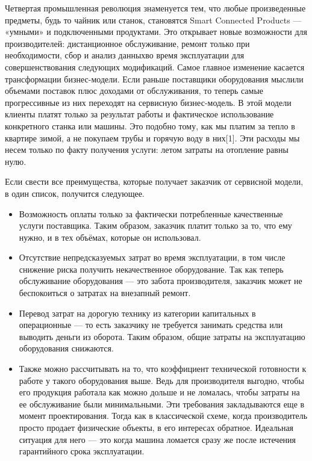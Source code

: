 \label{sec:intro}

Четвертая промышленная революция знаменуется тем, что любые произведенные предметы, будь то чайник или станок, становятся Smart Connected Products — «умными» и подключенными продуктами.
Это открывает новые возможности для производителей: дистанционное обслуживание, ремонт только при необходимости, сбор и анализ данныхво время эксплуатации для совершенствования следующих модификаций.
Самое главное изменение касается трансформации бизнес-модели. Если раньше поставщики оборудования мыслили объемами поставок плюс доходами от обслуживания, то теперь самые прогрессивные из них переходят на сервисную бизнес-модель.
В этой модели клиенты платят только за результат работы и фактическое использование конкретного станка или машины.
Это подобно тому, как мы платим за тепло в квартире зимой, а не покупаем трубы и горячую воду в них[1].
Эти расходы мы несем только по факту получения услуги: летом затраты на отопление равны нулю.

Если свести все преимущества, которые получает заказчик от сервисной модели, в один список, получится следующее.

\begin{itemize}
    \item Возможность оплаты только за фактически потребленные качественные услуги поставщика.
    Таким образом, заказчик платит только за то, что ему нужно, и в тех объёмах, которые он использовал.
    \item Отсутствие непредсказуемых затрат во время эксплуатации, в том числе снижение риска получить некачественное оборудование.
    Так как теперь обслуживание оборудования — это забота производителя, заказчик может не беспокоиться о затратах на внезапный ремонт.
    \item Перевод затрат на дорогую технику из категории капитальных в операционные — то есть заказчику не требуется занимать средства или выводить деньги из оборота.
    Таким образом, общие затраты на эксплуатацию оборудования снижаются.
    \item Также можно рассчитывать на то, что коэффициент технической готовности к работе у такого оборудования выше.
    Ведь для производителя выгодно, чтобы его продукция работала как можно дольше и не ломалась, чтобы затраты на ее обслуживание были минимальными.
    Эти требования закладываются еще в момент проектирования.
    Тогда как в классической схеме, когда производитель просто продает физические объекты, в его интересах обратное.
    Идеальная ситуация для него — это когда машина ломается сразу же после истечения гарантийного срока эксплуатации.
    \end{itemize}

